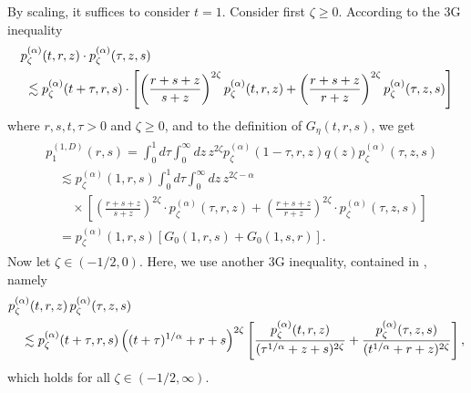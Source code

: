 \documentclass[12pt,reqno]{amsart}
\theoremstyle{definition}
\theoremstyle{remark}
\numberwithin{equation}{section}
\newcommand{\1}{\mathbbm{1}}
\newcommand{\one}{\mathbf{1}}
\begin{document}
By scaling, it suffices to consider $t=1$. Consider first $\zeta\geq0$. According to the 3G inequality \cite[Theorem~3.1]{BogdanMerz2025}
\begin{align}
  \label{eq:3gheatalpha2}
  & p_\zeta^{(\alpha)}(t,r,z)\cdot p_\zeta^{(\alpha)}(\tau,z,s) \\
  & \ \lesssim p_\zeta^{(\alpha)}(t+\tau,r,s) \cdot \left[ \left(\frac{r+s+z}{s+z}\right)^{2\zeta} p_\zeta^{(\alpha)}(t,r,z) + \left(\frac{r+s+z}{r+z}\right)^{2\zeta} p_\zeta^{(\alpha)}(\tau,z,s)\right] \notag
\end{align}
where $r,s,t,\tau>0$ and $\zeta\geq0$, and to the definition of $G_\eta(t,r,s)$, we get
\begin{align}
  \begin{split}
    & p_1^{(1,D)}(r,s) = \int_0^1 d\tau \int_0^\infty dz\, z^{2\zeta} p_{\zeta}^{(\alpha)}(1-\tau,r,z) q(z) p_\zeta^{(\alpha)}(\tau,z,s) \\
    & \quad \lesssim p_\zeta^{(\alpha)}(1,r,s) \int_0^1 d\tau \int_0^\infty dz\, z^{2\zeta-\alpha} \\
    & \qquad \times \left[\left(\frac{r+s+z}{s+z}\right)^{2\zeta} \cdot p_\zeta^{(\alpha)}(\tau,r,z) 
      + \left(\frac{r+s+z}{r+z}\right)^{2\zeta} \cdot p_\zeta^{(\alpha)}(\tau,z,s)\right] \\
    & \quad = p_\zeta^{(\alpha)}(1,r,s) \left[G_0(1,r,s) + G_0(1,s,r)\right].
  \end{split}
\end{align}
Now let $\zeta\in(-1/2,0)$. Here, we use another 3G inequality, contained in \cite[Lemma~2.5]{Bogdanetal2024}, namely
\begin{align}
  \label{eq:3gheatalphanew}
  & p_\zeta^{(\alpha)}(t,r,z)\,p_\zeta^{(\alpha)}(\tau,z,s) \\
  & \quad \lesssim p_\zeta^{(\alpha)}(t+\tau,r,s) \left((t+\tau)^{1/\alpha}+r+s\right)^{2\zeta} \left[\frac{p_\zeta^{(\alpha)}(t,r,z)}{(\tau^{1/\alpha}+z+s)^{2\zeta}} + \frac{p_\zeta^{(\alpha)}(\tau,z,s)}{(t^{1/\alpha}+r+z)^{2\zeta}} \right], \notag
\end{align}
which holds for all $\zeta\in(-1/2,\infty)$.
\end{document}
